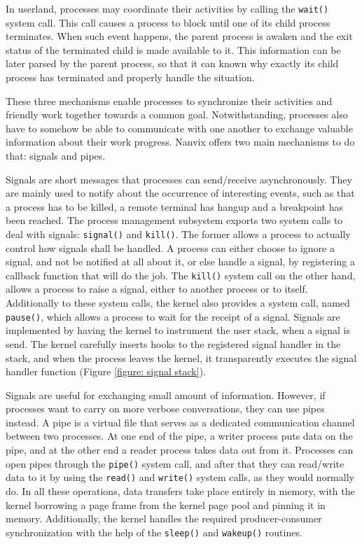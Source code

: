 \documentclass[10pt,a4paper]{article}
\begin{document}
In userland, processes may coordinate their activities by calling the \texttt{wait()} system call. This call causes a process to block until one of its child process terminates. When such event happens, the parent process is awaken and the exit status of the terminated child is made available to it. This information can be later parsed by the parent process, so that it can known why exactly its child process has terminated and properly handle the situation.

These three mechanisms enable processes to synchronize their activities and friendly work together towards a common goal. Notwithstanding, processes also have to somehow be able to communicate with one another to exchange valuable information about their work progress. Nanvix offers two main mechanisms to do that: signals and pipes.

Signals are short messages that processes can send/receive asynchronously. They are mainly used to notify about the occurrence of interesting events, such as that a process has to be killed, a remote terminal has hangup and a breakpoint has been reached. The process management subsystem exports two system calls to deal with signals: \texttt{signal()} and \texttt{kill()}. The former allows a process to actually control how signals shall be handled. A process can either choose to ignore a signal, and not be notified at all about it, or else handle a signal, by registering a callback function that will do the job. The \texttt{kill()} system call on the other hand, allows a process to raise a signal, either to another process or to itself. Additionally to these system calls, the kernel also provides a system call, named \texttt{pause()}, which allows a process to wait for the receipt of a signal. Signals are implemented by having the kernel to instrument the user stack, when a signal is send. The kernel carefully inserts hooks to the registered signal handler in the stack, and when the process leaves the kernel, it transparently executes the signal handler function (Figure \ref{figure: signal stack}).

Signals are useful for exchanging small amount of information. However, if processes want to carry on more verbose conversations, they can use pipes instead. A pipe is a virtual file that serves as a dedicated communication channel between two processes. At one end of the pipe, a writer process puts data on the pipe, and at the other end a reader process takes data out from it. Processes can open pipes through the \texttt{pipe()} system call, and after that they can read/write data to it by using the \texttt{read()} and \texttt{write()} system calls, as they would normally do. In all these operations, data transfers take place entirely in memory, with the kernel borrowing a page frame from the kernel page pool and pinning it in memory. Additionally, the kernel handles the required producer-consumer synchronization with the help of the \texttt{sleep()} and \texttt{wakeup()} routines.
\end{document}
